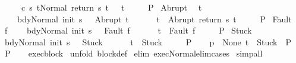\begin{isabellebody}
\ \ \ \ \ {\isasymGamma}{\isasymturnstile}{\isasymlangle}c\ s\ t{\isacharprime}{\isacharcomma}Normal\ {\isacharparenleft}return\ s\ t{\isacharprime}{\isacharparenright}{\isasymrangle}\ {\isasymRightarrow}\ \ t{\isasymrbrakk}\isanewline
\ \ \ \ {\isasymLongrightarrow}\ P{\isachardoublequoteclose}\isanewline
{}\ Abrupt{\isacharcolon}\ \isanewline
\ {\isachardoublequoteopen}{\isasymAnd}t{\isacharprime}{\isachardot}\isanewline
\ \ \ \ {\isasymlbrakk}{\isasymGamma}{\isasymturnstile}{\isasymlangle}bdy{\isacharcomma}Normal\ {\isacharparenleft}init\ s{\isacharparenright}{\isasymrangle}\ {\isasymRightarrow}\ \ Abrupt\ t{\isacharprime}{\isacharsemicolon}\ \isanewline
\ \ \ \ \ t\ {\isacharequal}\ Abrupt\ {\isacharparenleft}return\ s\ t{\isacharprime}{\isacharparenright}{\isasymrbrakk}\isanewline
\ \ \ \ {\isasymLongrightarrow}\ P{\isachardoublequoteclose}\isanewline
{}\ Fault{\isacharcolon}\isanewline
\ {\isachardoublequoteopen}{\isasymAnd}f{\isachardot}\isanewline
\ \ \ \ {\isasymlbrakk}{\isasymGamma}{\isasymturnstile}{\isasymlangle}bdy{\isacharcomma}Normal\ {\isacharparenleft}init\ s{\isacharparenright}{\isasymrangle}\ {\isasymRightarrow}\ \ Fault\ f{\isacharsemicolon}\ \isanewline
\ \ \ \ \ t\ {\isacharequal}\ Fault\ f{\isasymrbrakk}\isanewline
\ \ \ \ {\isasymLongrightarrow}\ P{\isachardoublequoteclose}\isanewline
{}\ Stuck{\isacharcolon}\isanewline
\ {\isachardoublequoteopen}{\isasymlbrakk}{\isasymGamma}{\isasymturnstile}{\isasymlangle}bdy{\isacharcomma}Normal\ {\isacharparenleft}init\ s{\isacharparenright}{\isasymrangle}\ {\isasymRightarrow}\ \ Stuck{\isacharsemicolon}\ \isanewline
\ \ \ \ \ t\ {\isacharequal}\ Stuck{\isasymrbrakk}\isanewline
\ \ \ \ {\isasymLongrightarrow}\ P{\isachardoublequoteclose}\isanewline
{}\ \isanewline
\ {\isachardoublequoteopen}{\isasymlbrakk}{\isasymGamma}\ p\ {\isacharequal}\ None{\isacharsemicolon}\ t\ {\isacharequal}\ Stuck{\isasymrbrakk}\ {\isasymLongrightarrow}\ P{\isachardoublequoteclose}\isanewline
{}\ {\isachardoublequoteopen}P{\isachardoublequoteclose}\isanewline
%
\isadelimproof
\ \ %
\endisadelimproof
%
\isatagproof
{}\isamarkupfalse%
\ exec{\isacharunderscore}block\isanewline
{}\isamarkupfalse%
\ {\isacharparenleft}unfold\ block{\isacharunderscore}def{\isacharparenright}\isanewline
{}\isamarkupfalse%
\ {\isacharparenleft}elim\ exec{\isacharunderscore}Normal{\isacharunderscore}elim{\isacharunderscore}cases{\isacharparenright}\isanewline
{}\isamarkupfalse%
\ simp{\isacharunderscore}all\isanewline

\end{isabellebody}
